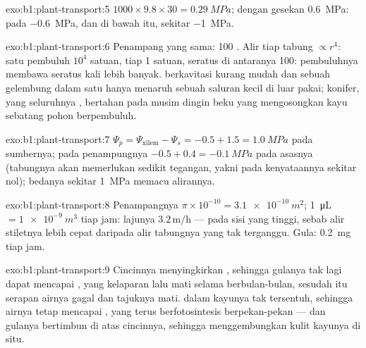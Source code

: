 \begin{solution}{exo:b1:plant-transport:5}
$1000\times 9.8\times 30 = \qty{0.29}{MPa}$; dengan gesekan
\qty{0.6}{MPa}:  pada \qty{-0.6}{MPa}, dan  di bawah
itu, sekitar \qty{-1}{MPa}.
\end{solution}

\begin{solution}{exo:b1:plant-transport:6}
Penampang yang sama: 100 . Alir tiap tabung $\propto r^4$: satu
pembuluh $10^4$ satuan, tiap  1 satuan, seratus di antaranya
100: pembuluhnya membawa seratus kali lebih banyak.  berkavitasi
kurang mudah dan sebuah gelembung dalam satu  hanya menaruh
sebuah saluran kecil di luar pakai; konifer, yang seluruhnya ,
bertahan pada musim dingin beku yang mengosongkan kayu sebatang pohon
berpembuluh.
\end{solution}

\begin{solution}{exo:b1:plant-transport:7}
$\Psi_p = \Psi_{\text{xilem}} - \Psi_s = -0.5 + 1.5 = \qty{1.0}{MPa}$
pada sumbernya; pada penampungnya $-0.5 + 0.4 = \qty{-0.1}{MPa}$ pada
asasnya (tabungnya akan memerlukan sedikit tegangan, yakni pada
kenyataannya  sekitar nol); bedanya sekitar \qty{1}{MPa} memacu
alirannya.
\end{solution}

\begin{solution}{exo:b1:plant-transport:8}
Penampangnya $\pi\times 10^{-10} = \qty{3.1e-10}{m^2}$; \qty{1}{\micro L}
$= \qty{1e-9}{m^3}$ tiap jam: lajunya $3.2\,\mathrm{m/h}$ --- pada sisi
yang tinggi, sebab alir stiletnya lebih cepat daripada alir tabungnya
yang tak terganggu. Gula: \qty{0.2}{mg} tiap jam.
\end{solution}

\begin{solution}{exo:b1:plant-transport:9}
Cincinnya menyingkirkan , sehingga gulanya tak lagi dapat
mencapai , yang kelaparan lalu mati selama berbulan-bulan,
sesudah itu serapan airnya gagal dan tajuknya mati.  dalam
kayunya tak tersentuh, sehingga airnya tetap mencapai , yang
terus berfotosintesis berpekan-pekan --- dan gulanya bertimbun di atas
cincinnya, sehingga menggembungkan kulit kayunya di situ.
\end{solution}

